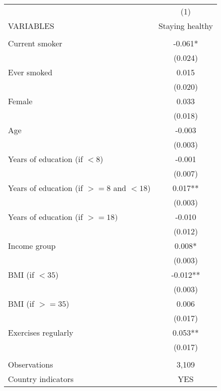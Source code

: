 \begin{tabular}{lc} \hline
 & (1) \\
VARIABLES & Staying healthy \\ \hline
 &  \\
Current smoker & -0.061* \\
 & (0.024) \\
Ever smoked & 0.015 \\
 & (0.020) \\
Female & 0.033 \\
 & (0.018) \\
Age & -0.003 \\
 & (0.003) \\
Years of education (if $<8$) & -0.001 \\
 & (0.007) \\
Years of education (if $>=8$ and $<18$) & 0.017** \\
 & (0.003) \\
Years of education (if $>=18) $ & -0.010 \\
 & (0.012) \\
Income group & 0.008* \\
 & (0.003) \\
BMI (if $<35$) & -0.012** \\
 & (0.003) \\
BMI (if $>=35$) & 0.006 \\
 & (0.017) \\
Exercises regularly & 0.053** \\
 & (0.017) \\
 &  \\
Observations & 3,109 \\
 Country indicators & YES \\ \hline
\end{tabular}
